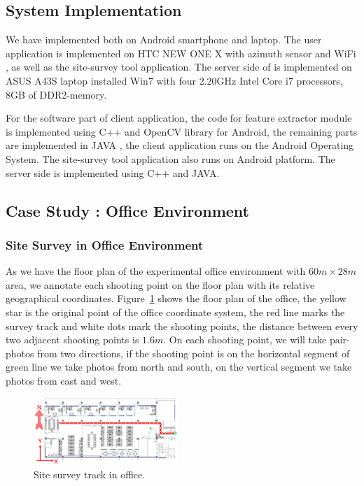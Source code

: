 \subsection{System Implementation}
We have implemented \oursystem both on Android smartphone and laptop. The user application is implemented on HTC NEW ONE X with azimuth sensor and WiFi , as well as the site-survey tool application. The server side of \oursystem is implemented on ASUS A43S laptop installed Win7 with four 2.20GHz Intel Core i7 processors, 8GB of DDR2-memory.

For the software part of client application, the code for feature extractor module is implemented using C++ and OpenCV library for Android, the remaining parts are implemented in JAVA , the client application runs on the Android Operating System. The site-survey tool application also runs on Android platform. The server side is implemented using C++ and JAVA.
\subsection{Case Study \uppercase\expandafter{}: Office Environment}
\subsubsection{Site Survey in Office Environment}

As we have the floor plan of the experimental office environment with $60m \times 28m$ area, we annotate each shooting point on the floor plan with its relative geographical coordinates. Figure~\ref{office_site} shows the floor plan of the office, the yellow star is the original point of the office coordinate system, the red line marks the survey track and white dots mark the shooting points, the distance between every two adjacent shooting points is $1.6m$. On each shooting point, we will take pair-photos from two directions, if the shooting point is on the horizontal segment of green line we take photos from north and south, on the vertical segment we take photos from east and west.
\begin{figure}[h!]
\centering
\includegraphics[width=1\linewidth, height=1in, clip,keepaspectratio]{officesite.eps}
\caption{Site survey track in office.}\label{office_site}
\end{figure}

